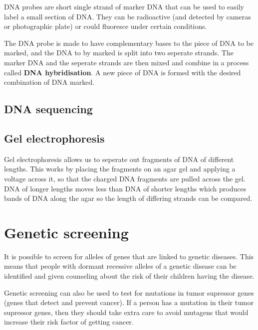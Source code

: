 \documentclass{article}
\begin{document}
DNA probes are short single strand of marker DNA that can be used to easily
label a small section of DNA. They can be radioactive (and detected by cameras
or photographic plate) or could fluoresce under certain conditions.

The DNA probe is made to have complementary bases to the piece of DNA to be
marked, and the DNA to by marked is split into two seperate strands. The marker
DNA and the seperate strands are then mixed and combine in a process called {\bf
DNA hybridisation}. A new piece of DNA is formed with the desired combination of
DNA marked.

\subsection*{DNA sequencing}


\subsection*{Gel electrophoresis}

Gel electrophoresis allows us to seperate out fragments of DNA of different
lengths. This works by placing the fragments on an agar gel and applying a
voltage across it, so that the charged DNA fragments are pulled across the gel.
DNA of longer lengths moves less than DNA of shorter lengths which produces
bands of DNA along the agar so the length of differing strands can be compared.


\section*{Genetic screening}

It is possible to screen for alleles of genes that are linked to genetic
diseases. This means that people with dormant recessive alleles of a genetic
disease can be identified and given counseling about the risk of their children
having the disease.

Genetic screening can also be used to test for mutations in tumor supressor
genes (genes that detect and prevent cancer). If a person has a mutation in
their tumor supressor genes, then they should take extra care to avoid mutagens
that would increase their risk factor of getting cancer.


\end{document}
